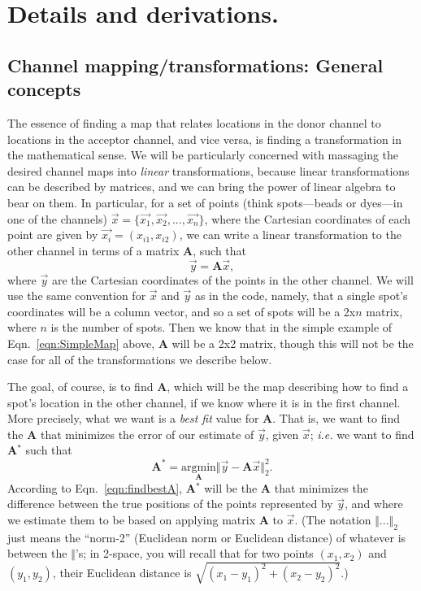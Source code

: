 \documentclass[11pt]{article}
\begin{document}
\section{Details and derivations.}\label{sec:Details}

\subsection{Channel mapping/transformations: General concepts}\label{sec:TransformGeneral}

The essence of finding a map that relates locations in the donor channel to locations in the acceptor channel, and vice versa, is finding a transformation in the mathematical sense.  We will be particularly concerned with massaging the desired channel maps into \textit{linear} transformations, because linear transformations can be described by matrices, and we can bring the power of linear algebra to bear on them.  In particular, for a set of points (think spots---beads or dyes---in one of the channels) $\vec{x} = \{\vec{x_1},\vec{x_2},...,\vec{x_n}\}$, where the Cartesian coordinates of each point are given by $\vec{x_i} = (x_{i1},x_{i2})$, we can write a linear transformation to the other channel in terms of a matrix {\bf A}, such that 
\begin{equation}
\vec{y} = \mathbf{A}\vec{x}, \label{eqn:SimpleMap}
\end{equation}
where $\vec{y}$ are the Cartesian coordinates of the points in the other channel.  We will use the same convention for $\vec{x}$ and $\vec{y}$ as in the code, namely, that a single spot's coordinates will be a column vector, and so a set of spots will be a 2x$n$ matrix, where $n$ is the number of spots.  Then we know that in the simple example of Eqn.~\eqref{eqn:SimpleMap} above, {\bf A} will be a 2x2 matrix, though this will not be the case for all of the transformations we describe below.  

The goal, of course, is to find {\bf A}, which will be the map describing how to find a spot's location in the other channel, if we know where it is in the first channel. More precisely, what we want is a {\it best fit} value for {\bf A}. That is, we want to find the {\bf A} that minimizes the error of our estimate of $\vec{y}$, given $\vec{x}$; {\it i.e.} we want to find {\bf A$^*$} such that
\begin{equation}
\mathbf{A^*} = \underset{\mathbf{A}}{\textrm{argmin}}\Vert {\vec y} - \mathbf{A}\vec{x}\Vert_2^2. \label{eqn:findbestA}
\end{equation}
According to Eqn.~\eqref{eqn:findbestA}, {\bf A$^*$} will be the {\bf A} that minimizes the difference between the true positions of the points represented by $\vec{y}$, and where we estimate them to be based on applying matrix {\bf A} to $\vec{x}$. (The notation $\Vert ... \Vert_2$ just means the ``norm-2'' (Euclidean norm or Euclidean distance) of whatever is between the $\Vert$'s; in 2-space, you will recall that for two points $(x_1,x_2)$ and $(y_1,y_2)$, their Euclidean distance is $\sqrt{(x_1-y_1)^2+(x_2-y_2)^2}$.) 
\end{document}
